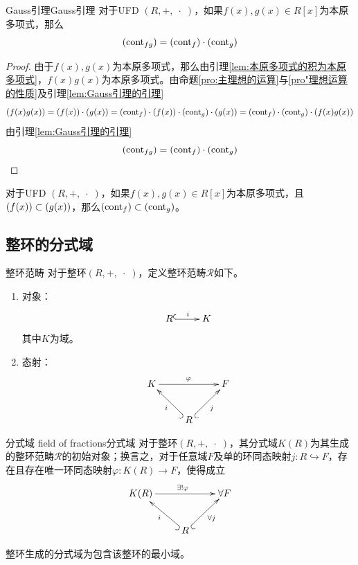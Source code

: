 \begin{theorem}{Gauss引理}{Gauss引理}
	对于UFD $(R,+,\;\cdot \;)$，如果$f(x),g(x)\in R[x]$为本原多项式，那么%
	$$
	(\text{cont}_{fg})=(\text{cont}_{f})\cdot(\text{cont}_{g})
	$$
\end{theorem}

\begin{proof}
	由于$f(x),g(x)$为本原多项式，那么由引理\ref{lem:本原多项式的积为本原多项式}，$f(x)g(x)$为本原多项式。由命题\ref{pro:主理想的运算}与\ref{pro"理想运算的性质}及引理\ref{lem:Gauss引理的引理}
	$$
	(f(x)g(x))
	=(f(x))\cdot (g(x))
	=(\text{cont}_f)\cdot(f(x))\cdot(\text{cont}_g)\cdot(g(x))
	=(\text{cont}_f)\cdot(\text{cont}_g)\cdot(f(x)g(x))
	$$
	由引理\ref{lem:Gauss引理的引理}
	$$
	(\text{cont}_{fg})=(\text{cont}_{f})\cdot(\text{cont}_{g})
	$$
\end{proof}

\begin{corollary}
	对于UFD $(R,+,\;\cdot \;)$，如果$f(x),g(x)\in R[x]$为本原多项式，且$(f(x))\subset (g(x))$，那么$(\text{cont}_f)\subset(\text{cont}_g)$。
\end{corollary}

\subsection{整环的分式域}

\begin{definition}{整环范畴}
	对于整环$(R,+,\;\cdot \;)$，定义整环范畴$\mathscr{R}$如下。
	\begin{enumerate}
		\item 对象：
		$$
		\xymatrix{
			R\ar@{^(->}[r]^i & K
		}
		$$
		其中$K$为域。
		\item 态射：
		$$
		\xymatrix{
			K \ar[rr]^\varphi  & & F \\
			& R \ar@{^(->}[ul]^{i} \ar@{_(->}[ur]_{j}
		}
		$$
	\end{enumerate}
\end{definition}

\begin{definition}{分式域 field of fractions}{分式域}
	对于整环$(R,+,\;\cdot \;)$，其分式域$K(R)$为其生成的整环范畴$\mathscr{R}$的初始对象；换言之，对于任意域$F$及单的环同态映射$j:R\hookrightarrow F$，存在且存在唯一环同态映射$\varphi:K(R)\to  F$，使得成立
	$$
	\xymatrix{
		K(R) \ar[rr]^{\exists!\varphi}  & & \forall F \\
		& R \ar@{^(->}[ul]^{i} \ar@{_(->}[ur]_{\forall j}
	}
	$$
\end{definition}

\begin{corollary}
	整环生成的分式域为包含该整环的最小域。
\end{corollary}

